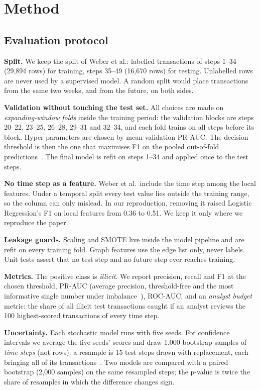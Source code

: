 \section{Method}
\label{sec:method}

\subsection{Evaluation protocol}

\textbf{Split.} We keep the split of Weber et al.: labelled transactions of steps
1--34 (29,894 rows) for training, steps 35--49 (16,670 rows) for testing.
Unlabelled rows are never used by a supervised model. A random split would place
transactions from the same two weeks, and from the future, on both sides.

\textbf{Validation without touching the test set.} All choices are made on
\emph{expanding-window folds} inside the training period: the validation blocks
are steps 20--22, 23--25, 26--28, 29--31 and 32--34, and each fold trains on all
steps before its block. Hyper-parameters are chosen by mean validation PR-AUC.
The decision threshold is then the one that maximises F1 on the pooled
out-of-fold predictions~\cite{lipton2014}. The final model is refit on steps
1--34 and applied once to the test steps.

\textbf{No time step as a feature.} Weber et al.\ include the time step among the
local features. Under a temporal split every test value lies outside the
training range, so the column can only mislead. In our reproduction, removing it
raised Logistic Regression's F1 on local features from 0.36 to 0.51. We keep it
only where we reproduce the paper.

\textbf{Leakage guards.} Scaling and SMOTE live inside the model pipeline and are
refit on every training fold. Graph features use the edge list only, never labels.
Unit tests assert that no test step and no future step ever reaches training.

\textbf{Metrics.} The positive class is \emph{illicit}. We report precision,
recall and F1 at the chosen threshold, PR-AUC (average precision, threshold-free
and the most informative single number under imbalance~\cite{saito2015}),
ROC-AUC, and an \emph{analyst budget} metric: the share of all illicit test
transactions caught if an analyst reviews the 100 highest-scored transactions of
every time step.

\textbf{Uncertainty.} Each stochastic model runs with five seeds. For confidence
intervals we average the five seeds' scores and draw 1,000 bootstrap samples of
\emph{time steps} (not rows): a resample is 15 test steps drawn with replacement,
each bringing all of its transactions~\cite{kunsch1989}. Two models are compared
with a paired bootstrap (2,000 samples) on the same resampled steps; the p-value
is twice the share of resamples in which the difference changes sign.

